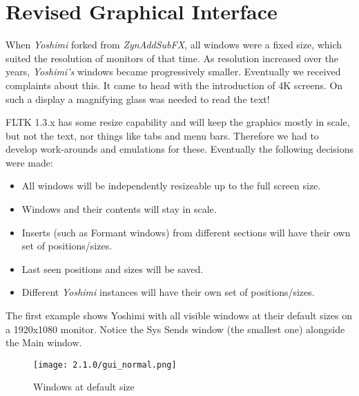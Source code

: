 %
%
%

\section{Revised Graphical Interface}
\label{sec:revised_interface}
   When \textsl{Yoshimi} forked from \textsl{ZynAddSubFX}, all windows were
   a fixed size, which suited the resolution of monitors of that time.
   As resolution increased over the years,
   \textsl{Yoshimi's} windows became progressively smaller.
   Eventually we received complaints about this.
   It came to head with the introduction of 4K
   screens. On such a display a magnifying glass was needed to read the text!

   FLTK 1.3.x has some resize capability and will keep the graphics mostly in
   scale, but not the text, nor things like tabs and menu bars. Therefore we had
   to develop work-arounds and emulations for these. Eventually the following
   decisions were made:

   \begin{itemize}
      \item All windows will be independently resizeable up to the full
         screen size.
      \item Windows and their contents will stay in scale.
      \item Inserts (such as Formant windows) from different sections will have
         their own set of positions/sizes.
      \item Last seen positions and sizes will be saved.
      \item Different \textsl{Yoshimi} instances will have their own set of
         positions/sizes.
   \end{itemize}

\pagebreak
   The first example shows Yoshimi with all visible windows at their default sizes
   on a 1920x1080 monitor. Notice the Sys Sends window (the smallest one)
   alongside the Main window.

   \begin{figure}[H]
      \centering
      \texttt{[image: 2.1.0/gui\_normal.png]}
      \caption{Windows at default size}
      \label{fig:default_size_windows}
   \end{figure}

